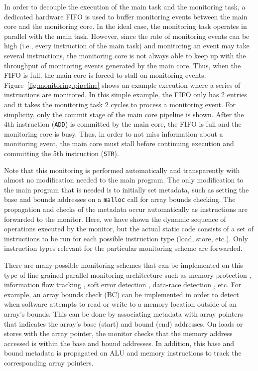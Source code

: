 In order to decouple the execution of the main task and the monitoring task, a
dedicated hardware FIFO is used to buffer monitoring events between the main
core and the monitoring core.
In the ideal case, the monitoring task operates in parallel with the main task.
However, since the rate of monitoring events can be high (i.e., every
instruction of the main task) and monitoring an event may take several
instructions, the monitoring core is not always able to keep
up with the throughput of monitoring events generated by the main core.
Thus, when the FIFO is full, the main core is forced to stall on monitoring events.
Figure~\ref{fig:monitoring.pipeline} shows an example execution where a series
of instructions are monitored. In this simple example, the FIFO only has 2
entries and it takes the monitoring task 2 cycles to process a monitoring
event. For simplicity, only the commit
stage of the main core pipeline is shown. 
After the 4th instruction ({\tt ADD}) is committed by the main core, the FIFO is full
and the monitoring core is busy. Thus, in order to not miss information about a
monitoring event, the main core must stall before continuing execution and
committing the 5th instruction ({\tt STR}).

Note that this monitoring is performed automatically and transparently with
almost no modification needed to the main program. The only modification to
the main program that is needed is to initially set metadata, such as setting
the base and bounds addresses on a {\tt malloc} call for array bounds checking.
The propagation and checks of the metadata occur automatically as
instructions are forwarded to the monitor.
Here, we have shown the dynamic sequence of operations executed by the monitor, but
the actual static code consists of a set of instructions to be run for each
possible instruction type (load, store, etc.). Only instruction types relevant
for the particular monitoring scheme are forwarded.

There are many possible monitoring schemes that can be implemented on this type
of fine-grained parallel monitoring architecture such as memory protection
\cite{mondrian-asplos02}, information flow tracking \cite{dift-asplos04,
testudo-micro08}, soft error detection \cite{argus-micro07}, data-race
detection \cite{cord-hpca06, eraser-tocs97, literace-pldi09, pacer-pldi10}, etc.  For example, an array bounds check (BC)
\cite{hardbound-asplos08} can be implemented in order to detect
when software attempts to read or write to a memory location outside of an
array's bounds. This can be done by associating metadata with array pointers that 
indicates the array's base (start) and bound (end) addresses. On loads or stores with the
array
pointer, the monitor checks that the memory address accessed is within the base and
bound addresses. In addition, this base and bound metadata
is propagated on ALU and memory instructions to track the corresponding array pointers.

